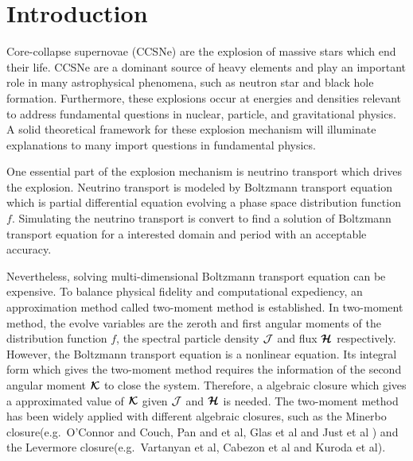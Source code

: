 \section{Introduction}

Core-collapse supernovae (CCSNe) are the explosion of massive stars which end their life.
CCSNe are a dominant source of heavy elements and play an important role in many astrophysical phenomena, such as neutron star and black hole formation.  
Furthermore, these explosions occur at energies and densities relevant to address fundamental questions in nuclear, particle, and gravitational physics. 
A solid theoretical framework for these explosion mechanism will illuminate explanations to many import questions in fundamental physics.

One essential part of the explosion mechanism is neutrino transport which drives the explosion.  
Neutrino transport is modeled by Boltzmann transport equation which is partial differential equation evolving a phase space distribution function $f$.
Simulating the neutrino transport is convert to find a solution of Boltzmann transport equation for a interested domain and period with an acceptable accuracy.

Nevertheless, solving multi-dimensional Boltzmann transport equation can be expensive.
To balance physical fidelity and computational expediency, an approximation method called two-moment method is established.
In two-moment method, the evolve variables are the zeroth and first angular moments of the distribution function $f$, the spectral particle density $\mathcal{J}$ and flux $\boldsymbol{\mathcal{H}}$ respectively.
However, the Boltzmann transport equation is a nonlinear equation.
Its integral form which gives the two-moment method requires the information of the second angular moment $\boldsymbol{\mathcal{K}}$ to close the system.
Therefore, a algebraic closure which gives a approximated value of $\boldsymbol{\mathcal{K}}$ given $\mathcal{J}$ and $\boldsymbol{\mathcal{H}}$ is needed.
The two-moment method has been widely applied with different algebraic closures, such as the Minerbo\cite{minerbo_1978} closure(e.g.~{O'Connor} and {Couch}\cite{oConnorCouch_2018}, Pan and et al\cite{pan_etal_2018}, Glas et al\cite{glas_etal_2018} and Just et al\cite{just_etal_2018} ) and the Levermore\cite{levermore_1984} closure(e.g.~Vartanyan et al\cite{vartanyan_etal_2018}, Cabezon et al\cite{cabezon_etal_2018} and Kuroda et al\cite{kuroda_etal_2016}). 

